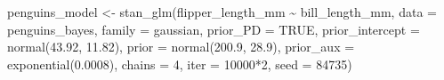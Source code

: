 \documentclass[
]{article}
\newenvironment{Shaded}{\begin{snugshade}}{\end{snugshade}}
\newcommand{\AttributeTok}[1]{\textcolor[rgb]{0.77,0.63,0.00}{#1}}
\newcommand{\ConstantTok}[1]{\textcolor[rgb]{0.00,0.00,0.00}{#1}}
\newcommand{\DecValTok}[1]{\textcolor[rgb]{0.00,0.00,0.81}{#1}}
\newcommand{\FloatTok}[1]{\textcolor[rgb]{0.00,0.00,0.81}{#1}}
\newcommand{\FunctionTok}[1]{\textcolor[rgb]{0.00,0.00,0.00}{#1}}
\newcommand{\NormalTok}[1]{#1}
\newcommand{\OtherTok}[1]{\textcolor[rgb]{0.56,0.35,0.01}{#1}}
\newcommand{\SpecialCharTok}[1]{\textcolor[rgb]{0.00,0.00,0.00}{#1}}
\begin{document}
\begin{Shaded}
\begin{Highlighting}[]
\NormalTok{penguins\_model }\OtherTok{\textless{}{-}} \FunctionTok{stan\_glm}\NormalTok{(flipper\_length\_mm }\SpecialCharTok{\textasciitilde{}}\NormalTok{ bill\_length\_mm, }\AttributeTok{data =}\NormalTok{ penguins\_bayes,}
                       \AttributeTok{family =}\NormalTok{ gaussian,}
                       \AttributeTok{prior\_PD =} \ConstantTok{TRUE}\NormalTok{, }
                       \AttributeTok{prior\_intercept =} \FunctionTok{normal}\NormalTok{(}\FloatTok{43.92}\NormalTok{, }\FloatTok{11.82}\NormalTok{),}
                       \AttributeTok{prior =} \FunctionTok{normal}\NormalTok{(}\FloatTok{200.9}\NormalTok{, }\FloatTok{28.9}\NormalTok{), }
                       \AttributeTok{prior\_aux =} \FunctionTok{exponential}\NormalTok{(}\FloatTok{0.0008}\NormalTok{),}
                       \AttributeTok{chains =} \DecValTok{4}\NormalTok{, }\AttributeTok{iter =} \DecValTok{10000}\SpecialCharTok{*}\DecValTok{2}\NormalTok{, }\AttributeTok{seed =} \DecValTok{84735}\NormalTok{)}
\end{Highlighting}
\end{Shaded}
\end{document}
